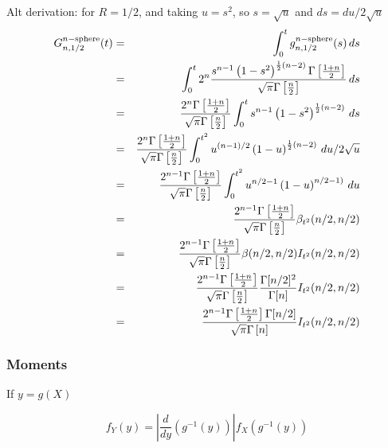Alt derivation: for $R=1/2$, and taking $u=s^2$, so $s = \sqrt{u}$ and
$ds = du/2\sqrt{u}$
\begin{eqnarray}
G^{n-{\rm sphere}}_{n,1/2}(t)
    & = & \int_0^t g^{n-{\rm sphere}}_{n,1/2}(s) \, ds \nonumber \\
    & = & \int_0^t  2^n \frac{s^{n-1}
             \left(1 -s^2\right)^{\frac{1}{2} (n-2)}
             \Gamma\left[\frac{1+n}{2}\right]}{\sqrt{\pi }
             \Gamma\left[\frac{n}{2}\right]} 
             \, ds \nonumber \\    
    & = & \frac{ 2^n \Gamma\left[\frac{1+n}{2}\right]}{\sqrt{\pi}\Gamma\left[\frac{n}{2}\right]}
           \int_0^t s^{n-1}  \left(1 -s^2\right)^{\frac{1}{2} (n-2)}
             \, ds \nonumber \\    
    & = & \frac{ 2^n \Gamma\left[\frac{1+n}{2}\right]}{\sqrt{\pi}\Gamma\left[\frac{n}{2}\right]}
           \int_0^{t^2} u^{(n-1)/2}  \left(1 - u\right)^{\frac{1}{2} (n-2)}
             \, du/2\sqrt{u}  \nonumber \\    
    & = & \frac{ 2^{n-1} \Gamma\left[\frac{1+n}{2}\right]}{\sqrt{\pi}\Gamma\left[\frac{n}{2}\right]}
           \int_0^{t^2} u^{n/2-1}  \left(1 - u\right)^{n/2-1)}
             \, du  \nonumber \\    
    & = & \frac{ 2^{n-1} \Gamma\left[\frac{1+n}{2}\right]}{\sqrt{\pi}\Gamma\left[\frac{n}{2}\right]}
               \beta_{t^2}(n/2, n/2)  \nonumber \\    
    & = & \frac{ 2^{n-1} \Gamma\left[\frac{1+n}{2}\right]}{\sqrt{\pi}\Gamma\left[\frac{n}{2}\right]}
              \beta(n/2,n/2) I_{t^2}(n/2, n/2)  \nonumber \\    
    & = & \frac{ 2^{n-1} \Gamma\left[\frac{1+n}{2}\right]}{\sqrt{\pi}\Gamma\left[\frac{n}{2}\right]}
              \frac{\Gamma[n/2]^2}{\Gamma[n]} I_{t^2}(n/2, n/2)  \nonumber \\    
    & = & \frac{ 2^{n-1} \Gamma\left[\frac{1+n}{2}\right]\Gamma[n/2] }{\sqrt{\pi}\Gamma\left[n\right]}
              I_{t^2}(n/2, n/2)  \nonumber \\    
\end{eqnarray}




\subsubsection{Moments}


If $y = g(X)$

\[ f_Y(y) = \left| \frac{d}{dy} \left( g^{-1}(y) \right) \right|
               f_X\left( g^{-1}(y) \right)
\]


